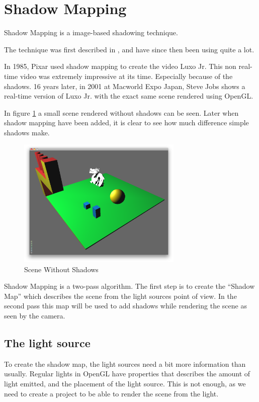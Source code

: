 
\section{Shadow Mapping}

Shadow Mapping is a image-based shadowing technique.

The technique was first described in \citep{lance78}, and have since
then been using quite a lot.

In 1985, Pixar used shadow mapping to create the video Luxo Jr. This
non real-time video was extremely impressive at its time. Especially
because of the shadows. 16 years later, in 2001 at Macworld Expo
Japan, Steve Jobs shows a real-time version of Luxo Jr. with the
exact same scene rendered using OpenGL.

In figure \ref{fig:scene} a small scene rendered without shadows can
be seen. Later when shadow mapping have been added, it is clear to see
how much difference simple shadows make.

\begin{figure}[h]
  \centering
  \includegraphics[width=0.7\textwidth]{gfx/scenenoshadow}  
  \caption{Scene Without Shadows}
  \label{fig:scene}
\end{figure}

Shadow Mapping is a two-pass algorithm. The first step is to create
the ``Shadow Map'' which describes the scene from the light sources
point of view. In the second pass this map will be used to add shadows
while rendering the scene as seen by the camera.


\subsection{The light source}

To create the shadow map, the light sources need a bit more
information than usually. Regular lights in OpenGL have properties
that describes the amount of light emitted, and the placement of the
light source. This is not enough, as we need to create a project to be
able to render the scene from the light.

